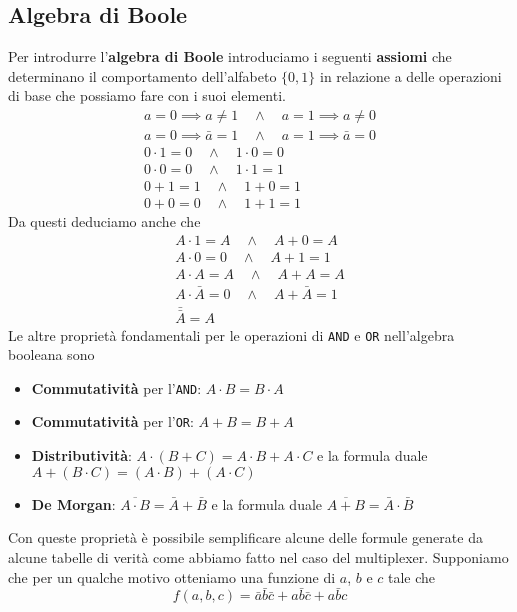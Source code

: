 \subsection{Algebra di Boole}
Per introdurre l'\textbf{algebra di Boole} introduciamo i seguenti \textbf{assiomi} che determinano
il comportamento dell'alfabeto $\{0, 1\}$ in relazione a delle operazioni di base che possiamo
fare con i suoi elementi.
\begin{gather*}
	a = 0 \implies a \neq 1 \quad \land \quad a = 1 \implies a \neq 0 \\
	a = 0 \implies \bar{a} = 1 \quad \land \quad a = 1 \implies \bar{a} = 0 \\
	0 \cdot 1 = 0 \quad \land \quad 1 \cdot 0 = 0 \\
	0 \cdot 0 = 0 \quad \land \quad 1 \cdot 1 = 1 \\
	0 + 1 = 1 \quad \land \quad 1 + 0 = 1 \\
	0 + 0 = 0 \quad \land \quad 1 + 1 = 1
\end{gather*}
Da questi deduciamo anche che
\begin{gather*}
	A \cdot 1 = A \quad \land \quad A + 0 = A \\
	A \cdot 0 = 0 \quad \land \quad A + 1 = 1 \\
	A \cdot A = A \quad \land \quad A + A = A \\
	A \cdot \bar{A} = 0 \quad \land \quad A + \bar{A} = 1 \\
	\bar{\bar{A}} = A
\end{gather*}
Le altre proprietà fondamentali per le operazioni di \verb|AND| e \verb|OR| nell'algebra booleana
sono
\begin{itemize}
	\item \textbf{Commutatività} per l'\verb|AND|: $A \cdot B = B \cdot A$
	\item \textbf{Commutatività} per l'\verb|OR|: $A + B = B + A$
	\item \textbf{Distributività}: $A \cdot (B + C) = A \cdot B + A \cdot C$ e la formula duale
	      $A + (B \cdot C) = (A \cdot B) + (A \cdot C)$
	\item \textbf{De Morgan}: $\overline{A \cdot B} = \bar{A} + \bar{B}$ e la formula duale
	      $\overline{A + B} = \bar{A} \cdot \bar{B}$
\end{itemize}
Con queste proprietà è possibile semplificare alcune delle formule generate da alcune tabelle di
verità come abbiamo fatto nel caso del multiplexer. Supponiamo che per un qualche motivo otteniamo
una funzione di $a$, $b$ e $c$ tale che
\[ f(a,b,c) = \bar{a} \bar{b} \bar{c} + a \bar{b} \bar{c} + a \bar{b} c \]
